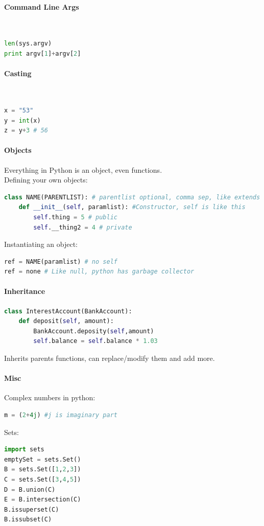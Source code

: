\documentclass[12 pt]{article}
\begin{document}
\paragraph{Command Line Args}~
\begin{lstlisting}[language=python]
len(sys.argv)
print argv[1]+argv[2]
\end{lstlisting}
\paragraph{Casting}~
\begin{lstlisting}[language=python]
x = "53"
y = int(x)
z = y+3 # 56
\end{lstlisting}
\paragraph{Objects}Everything in Python is an object, even functions.
\\ Defining your own objects:
\begin{lstlisting}[language=python]
class NAME(PARENTLIST): # parentlist optional, comma sep, like extends
    def __init__(self, paramlist): #Constructor, self is like this
        self.thing = 5 # public
        self.__thing2 = 4 # private
\end{lstlisting}
Instantiating an object:
\begin{lstlisting}[language=python]
ref = NAME(paramlist) # no self
ref = none # Like null, python has garbage collector
\end{lstlisting}
\paragraph{Inheritance}
\begin{lstlisting}[language=python]
class InterestAccount(BankAccount):
    def deposit(self, amount):
        BankAccount.deposity(self,amount)
        self.balance = self.balance * 1.03
\end{lstlisting}
Inherits parents functions, can replace/modify them and add more.
\paragraph{Misc}
Complex numbers in python:
\begin{lstlisting}[language=python]
m = (2+4j) #j is imaginary part
\end{lstlisting}
Sets:
\begin{lstlisting}[language=python]
import sets
emptySet = sets.Set()
B = sets.Set([1,2,3])
C = sets.Set([3,4,5])
D = B.union(C)
E = B.intersection(C)
B.issuperset(C)
B.issubset(C)
\end{lstlisting}
\end{document}
